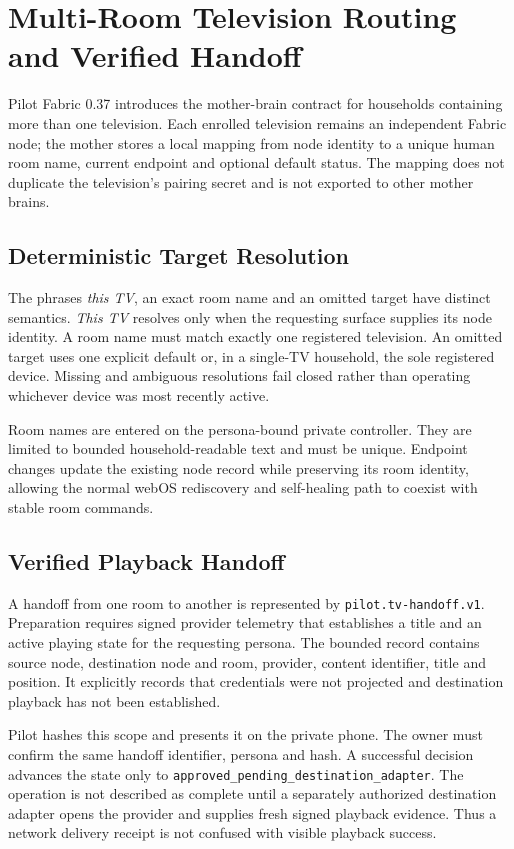 \section{Multi-Room Television Routing and Verified Handoff}
\label{sec:pilot-multi-room-tv}

Pilot Fabric 0.37 introduces the mother-brain contract for households containing
more than one television.  Each enrolled television remains an independent
Fabric node; the mother stores a local mapping from node identity to a unique
human room name, current endpoint and optional default status.  The mapping does
not duplicate the television's pairing secret and is not exported to other
mother brains.

\subsection{Deterministic Target Resolution}

The phrases \emph{this TV}, an exact room name and an omitted target have distinct
semantics.  \emph{This TV} resolves only when the requesting surface supplies its
node identity.  A room name must match exactly one registered television.  An
omitted target uses one explicit default or, in a single-TV household, the sole
registered device.  Missing and ambiguous resolutions fail closed rather than
operating whichever device was most recently active.

Room names are entered on the persona-bound private controller.  They are limited
to bounded household-readable text and must be unique.  Endpoint changes update
the existing node record while preserving its room identity, allowing the normal
webOS rediscovery and self-healing path to coexist with stable room commands.

\subsection{Verified Playback Handoff}

A handoff from one room to another is represented by
\texttt{pilot.tv-handoff.v1}.  Preparation requires signed provider telemetry
that establishes a title and an active playing state for the requesting persona.
The bounded record contains source node, destination node and room, provider,
content identifier, title and position.  It explicitly records that credentials
were not projected and destination playback has not been established.

Pilot hashes this scope and presents it on the private phone.  The owner must
confirm the same handoff identifier, persona and hash.  A successful decision
advances the state only to
\texttt{approved\_pending\_destination\_adapter}.  The operation is not described
as complete until a separately authorized destination adapter opens the provider
and supplies fresh signed playback evidence.  Thus a network delivery receipt is
not confused with visible playback success.

